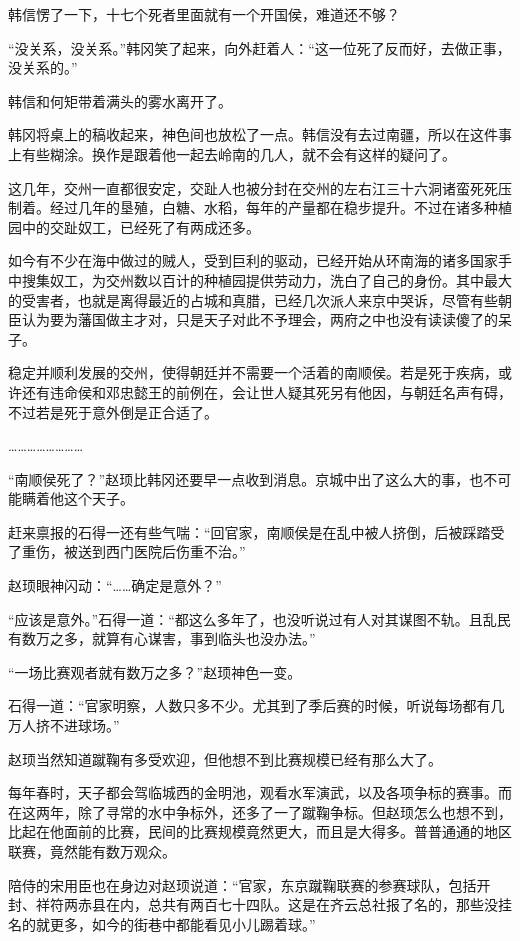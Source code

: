 韩信愣了一下，十七个死者里面就有一个开国侯，难道还不够？

“没关系，没关系。”韩冈笑了起来，向外赶着人：“这一位死了反而好，去做正事，没关系的。”

韩信和何矩带着满头的雾水离开了。

韩冈将桌上的稿收起来，神色间也放松了一点。韩信没有去过南疆，所以在这件事上有些糊涂。换作是跟着他一起去岭南的几人，就不会有这样的疑问了。

这几年，交州一直都很安定，交趾人也被分封在交州的左右江三十六洞诸蛮死死压制着。经过几年的垦殖，白糖、水稻，每年的产量都在稳步提升。不过在诸多种植园中的交趾奴工，已经死了有两成还多。

如今有不少在海中做过的贼人，受到巨利的驱动，已经开始从环南海的诸多国家手中搜集奴工，为交州数以百计的种植园提供劳动力，洗白了自己的身份。其中最大的受害者，也就是离得最近的占城和真腊，已经几次派人来京中哭诉，尽管有些朝臣认为要为藩国做主才对，只是天子对此不予理会，两府之中也没有读读傻了的呆子。

稳定并顺利发展的交州，使得朝廷并不需要一个活着的南顺侯。若是死于疾病，或许还有违命侯和邓忠懿王的前例在，会让世人疑其死另有他因，与朝廷名声有碍，不过若是死于意外倒是正合适了。

……………………

“南顺侯死了？”赵顼比韩冈还要早一点收到消息。京城中出了这么大的事，也不可能瞒着他这个天子。

赶来禀报的石得一还有些气喘：“回官家，南顺侯是在乱中被人挤倒，后被踩踏受了重伤，被送到西门医院后伤重不治。”

赵顼眼神闪动：“……确定是意外？”

“应该是意外。”石得一道：“都这么多年了，也没听说过有人对其谋图不轨。且乱民有数万之多，就算有心谋害，事到临头也没办法。”

“一场比赛观者就有数万之多？”赵顼神色一变。

石得一道：“官家明察，人数只多不少。尤其到了季后赛的时候，听说每场都有几万人挤不进球场。”

赵顼当然知道蹴鞠有多受欢迎，但他想不到比赛规模已经有那么大了。

每年春时，天子都会驾临城西的金明池，观看水军演武，以及各项争标的赛事。而在这两年，除了寻常的水中争标外，还多了一了蹴鞠争标。但赵顼怎么也想不到，比起在他面前的比赛，民间的比赛规模竟然更大，而且是大得多。普普通通的地区联赛，竟然能有数万观众。

陪侍的宋用臣也在身边对赵顼说道：“官家，东京蹴鞠联赛的参赛球队，包括开封、祥符两赤县在内，总共有两百七十四队。这是在齐云总社报了名的，那些没挂名的就更多，如今的街巷中都能看见小儿踢着球。”

